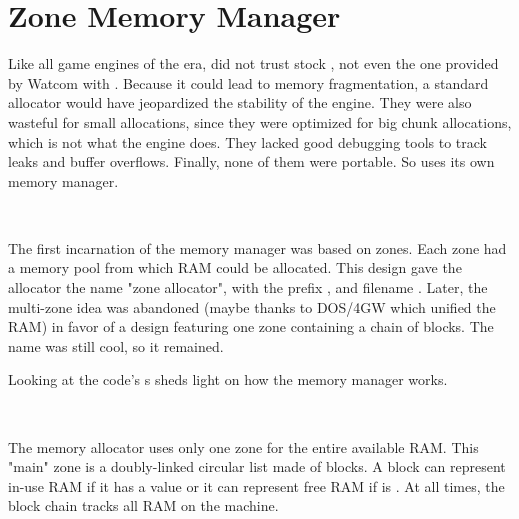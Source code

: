 \section{Zone Memory Manager}
Like all game engines of the era, \doom{} did not trust stock , not even the one provided by Watcom with . Because it could lead to memory fragmentation, a standard allocator would have jeopardized the stability of the engine. They were also wasteful for small allocations, since they were optimized for big chunk allocations, which is not what the engine does. They lacked good debugging tools to track leaks and buffer overflows. Finally, none of them were portable. So \doom{} uses its own memory manager.\\
\par

\\
\par
The first incarnation of the memory manager was based on zones. Each zone had a memory pool from which RAM could be allocated. This design gave the allocator the name "zone allocator", with the prefix , and filename . Later, the multi-zone idea was abandoned (maybe thanks to DOS/4GW which unified the RAM) in favor of a design featuring one zone containing a chain of blocks. The  name was still cool, so it remained.\\
\par
Looking at the code's s sheds light on how the memory manager works.\\
\par
{}\\
\par
The memory allocator uses only one zone for the entire available RAM. This "main" zone is a doubly-linked circular list made of blocks. A block can represent in-use RAM if it has a  value or it can represent free RAM if  is . At all times, the block chain tracks all RAM on the machine.




